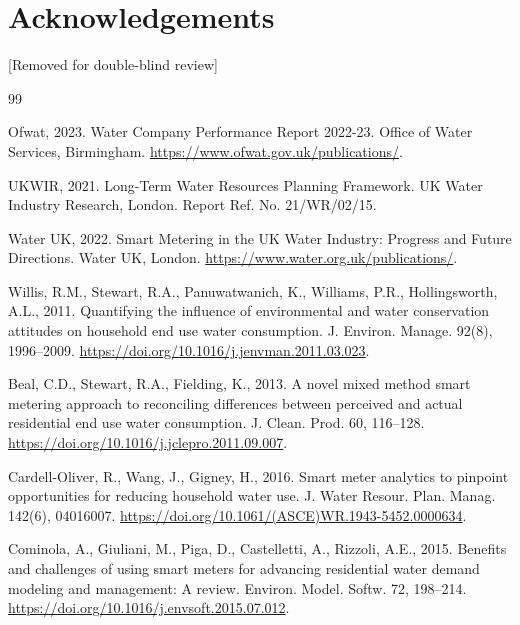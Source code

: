 \documentclass[a4paper,12pt]{article}
\begin{document}
\section*{Acknowledgements}
[Removed for double-blind review]



\begin{thebibliography}{99}
	

Ofwat, 2023. Water Company Performance Report 2022-23. Office of Water Services, Birmingham. \url{https://www.ofwat.gov.uk/publications/}.

UKWIR, 2021. Long-Term Water Resources Planning Framework. UK Water Industry Research, London. Report Ref. No. 21/WR/02/15.

Water UK, 2022. Smart Metering in the UK Water Industry: Progress and Future Directions. Water UK, London. \url{https://www.water.org.uk/publications/}.

Willis, R.M., Stewart, R.A., Panuwatwanich, K., Williams, P.R., Hollingsworth, A.L., 2011. Quantifying the influence of environmental and water conservation attitudes on household end use water consumption. J. Environ. Manage. 92(8), 1996--2009. \url{https://doi.org/10.1016/j.jenvman.2011.03.023}.

Beal, C.D., Stewart, R.A., Fielding, K., 2013. A novel mixed method smart metering approach to reconciling differences between perceived and actual residential end use water consumption. J. Clean. Prod. 60, 116--128. \url{https://doi.org/10.1016/j.jclepro.2011.09.007}.

Cardell-Oliver, R., Wang, J., Gigney, H., 2016. Smart meter analytics to pinpoint opportunities for reducing household water use. J. Water Resour. Plan. Manag. 142(6), 04016007. \url{https://doi.org/10.1061/(ASCE)WR.1943-5452.0000634}.

Cominola, A., Giuliani, M., Piga, D., Castelletti, A., Rizzoli, A.E., 2015. Benefits and challenges of using smart meters for advancing residential water demand modeling and management: A review. Environ. Model. Softw. 72, 198--214. \url{https://doi.org/10.1016/j.envsoft.2015.07.012}.


\end{thebibliography}
\end{document}
